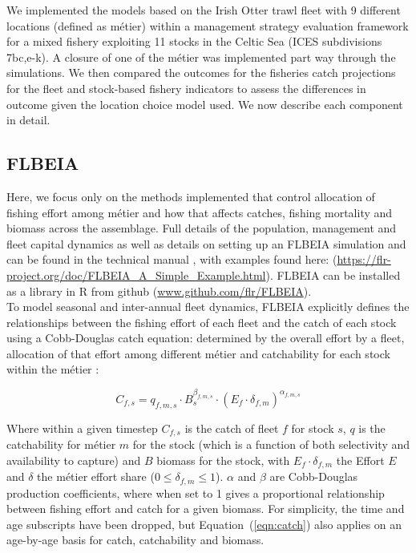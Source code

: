 \documentclass[12pt, halfline, a4paper]{ouparticle}
\begin{document}
We implemented the models based on the Irish Otter trawl fleet with 9 different
locations (defined as métier) within a management strategy evaluation framework
for a mixed fishery exploiting 11 stocks in the Celtic Sea (ICES subdivisions
7bc,e-k). A closure of one of the métier was implemented part way through the
simulations. We then compared the outcomes for the fisheries catch projections
for the fleet and stock-based fishery indicators to assess the differences in
outcome given the location choice model used. We now describe each component in
detail.

\subsection{FLBEIA}

Here, we focus only on the methods implemented that control allocation of
fishing effort among métier and how that affects catches, fishing mortality and
biomass across the assemblage. Full details of the population, management and
fleet capital dynamics as well as details on setting up an FLBEIA simulation
and can be found in the technical manual \citep{Garcia2017a}, with examples
found here: (\url{https://flr-project.org/doc/FLBEIA_A_Simple_Example.html}).
FLBEIA can be installed as a library in R from github
(\url{www.github.com/flr/FLBEIA}).\\ 

To model seasonal and inter-annual fleet dynamics, FLBEIA explicitly defines
the relationships between the fishing effort of each fleet and the catch of
each stock using a Cobb-Douglas catch equation: determined by the overall
effort by a fleet, allocation of that effort among different métier and
catchability for each stock within the métier \citep{Garcia2017a}:

\begin{equation}
 C_{f,s} = q_{f,m,s}\cdot B_{s}^{\beta_{f,m,s}} \cdot \left(E_{f}\cdot
	 \delta_{f,m} \right)^{\alpha_{f,m,s}}	
	 \label{eqn:catch}
\end{equation}

Where within a given timestep $C_{f,s}$ is the catch of fleet $f$ for stock
$s$, $q$ is the catchability for métier $m$ for the stock (which is a function
of both selectivity and availability to capture) and $B$ biomass for the stock,
with $E_{f}\cdot \delta_{f,m}$ the Effort $E$ and $\delta$ the métier effort
share ($0 \le \delta_{f,m} \le 1$). $\alpha$ and $\beta$ are Cobb-Douglas
production coefficients, where when set to 1 gives a proportional relationship
between fishing effort and catch for a given biomass. For simplicity, the time
and age subscripts have been dropped, but Equation~(\ref{eqn:catch}) also
applies on an age-by-age basis for catch, catchability and biomass. \\
\end{document}

